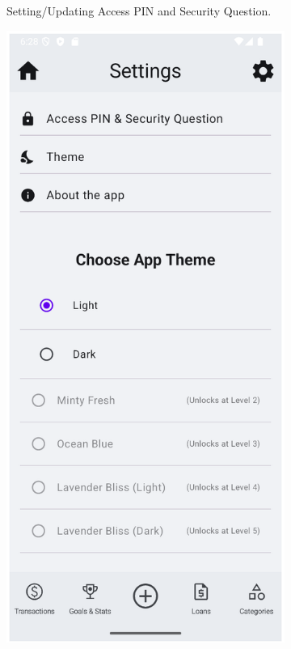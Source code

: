 \documentclass[a4paper,12pt]{article}
\begin{document}
\begin{figure}[H]
\begin{subfigure}[b]{0.23\textwidth}
        \caption{Setting/Updating Access PIN and Security Question.}
        \label{fig:settings_pin_security}
    \end{subfigure}
    \hfill
    \begin{subfigure}[b]{0.23\textwidth}
        \includegraphics[width=\textwidth]{settings_theme.png}

\end{subfigure}
\end{figure}
\end{document}
